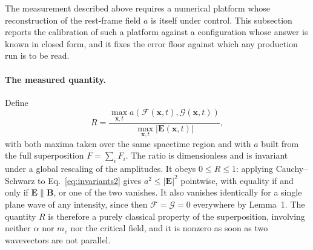 \documentclass[aps,prd,reprint,superscriptaddress,nofootinbib,floatfix]{revtex4-2}
\begin{document}
The measurement described above requires a numerical platform whose
reconstruction of the rest-frame field $a$ is itself under control. This
subsection reports the calibration of such a platform against a configuration
whose answer is known in closed form, and it fixes the error floor against
which any production run is to be read.

\paragraph{The measured quantity.} Define
\begin{equation}
R=\frac{\max_{\mathbf{x},t}a(\mathcal{F}(\mathbf{x},t),\mathcal{G}(\mathbf{x},t))}
{\max_{\mathbf{x},t}\left|\mathbf{E}(\mathbf{x},t)\right|},
\label{eq:ratio}
\end{equation}
with both maxima taken over the same spacetime region and with $a$ built from
the full superposition $F=\sum_iF_i$. The ratio is dimensionless and is
invariant under a global rescaling of the amplitudes. It obeys $0\le R\le1$:
applying Cauchy--Schwarz to Eq.~\eqref{eq:invariants2} gives
$a^2\le|\mathbf{E}|^2$ pointwise, with equality if and only if
$\mathbf{E}\parallel\mathbf{B}$, or one of the two vanishes. It also vanishes
identically for a single plane wave of any intensity, since then
$\mathcal{F}=\mathcal{G}=0$ everywhere by Lemma~1. The quantity $R$ is
therefore a purely classical property of the superposition, involving neither
$\alpha$ nor $m_e$ nor the critical field, and it is nonzero as soon as two
wavevectors are not parallel.
\end{document}
